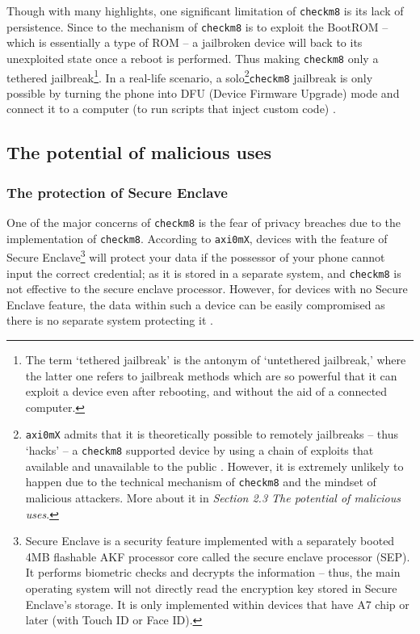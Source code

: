 \documentclass[10pt]{article}
\newcommand{\inlinecode}{\texttt}
\begin{document}
Though with many highlights, one significant limitation of \inlinecode{checkm8} is its lack of persistence. Since to the mechanism of \inlinecode{checkm8} is to exploit the BootROM -- which is essentially a type of ROM -- a jailbroken device will back to its unexploited state once a reboot is performed. Thus making \inlinecode{checkm8} only a tethered jailbreak\footnote{The term `tethered jailbreak' is the antonym of `untethered jailbreak,' where the latter one refers to jailbreak methods which are so powerful that it can exploit a device even after rebooting, and without the aid of a connected computer.}. In a real-life scenario, a solo\footnote{\inlinecode{axi0mX} admits that it is theoretically possible to remotely jailbreaks -- thus `hacks' -- a \inlinecode{checkm8} supported device by using a chain of exploits that available and unavailable to the public \cite{cite:3}. However, it is extremely unlikely to happen due to the technical mechanism of \inlinecode{checkm8} and the mindset of malicious attackers. More about it in \textit{Section 2.3 The potential of malicious uses}.}\inlinecode{checkm8} jailbreak is only possible by turning the phone into DFU (Device Firmware Upgrade) mode and connect it to a computer (to run scripts that inject custom code) .

\subsection{The potential of malicious uses}
\subsubsection{The protection of Secure Enclave}
One of the major concerns of \inlinecode{checkm8} is the fear of privacy breaches due to the implementation of \inlinecode{checkm8}. According to \inlinecode{axi0mX}, devices with the feature of Secure Enclave\footnote{Secure Enclave is a security feature implemented with a separately booted 4MB flashable AKF processor core called the secure enclave processor (SEP). It performs biometric checks and decrypts the information -- thus, the main operating system will not directly read the encryption key stored in Secure Enclave's storage. It is only implemented within devices that have A7 chip or later (with Touch ID or Face ID).} will protect your data if the possessor of your phone cannot input the correct credential; as it is stored in a separate system, and \inlinecode{checkm8} is not effective to the secure enclave processor. However, for devices with no Secure Enclave feature, the data within such a device can be easily compromised as there is no separate system protecting it \cite{cite:3}.
\end{document}
